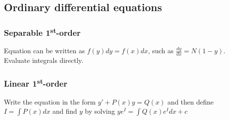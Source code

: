 \documentclass[letterpaper,landscape,10pt]{article}
\begin{document}
{\begin{multicols}{3}
	\subsection*{Ordinary differential equations}
		\subsubsection*{Separable 1\textsuperscript{st}-order}
			Equation can be written as $f(y)dy = f(x)dx$, such as
			$\frac{dy}{dx} = N(1-y)$.  Evaluate integrals directly.

		\subsubsection*{Linear 1\textsuperscript{st}-order}%
			Write the equation in the form $ y' + P(x)y = Q(x) $ and then define
			$ I = \int P(x)dx $ and find $y$ by solving $ ye^{I} = \int Q(x)e^{I}dx+c $



\end{multicols}}
\end{document}
